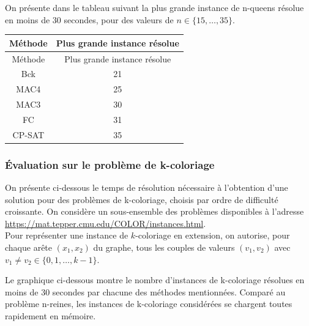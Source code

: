 \documentclass[14pt]{article}
\begin{document}
On présente dans le tableau suivant la plus grande instance de n-queens résolue en moins de 30 secondes, pour des valeurs de $n \in \{15,\dots,35\}$.

\begin{longtable}{|c|c|}
    \hline
    Méthode & Plus grande instance résolue \\
    \hline
    \endfirsthead

    Méthode & Plus grande instance résolue \\
    \hline
    \endhead

    \hline
    \endfoot

    \hline
    \endlastfoot

    Bck     & 21                           \\
    MAC4    & 25                           \\
    MAC3    & 30                           \\
    FC      & 31                           \\
    CP-SAT  & 35                           \\
\end{longtable}

\subsubsection{Évaluation sur le problème de k-coloriage}

On présente ci-dessous le temps de résolution nécessaire à l'obtention d'une solution pour des problèmes de k-coloriage, choisis par ordre de difficulté croissante. On considère un sous-ensemble des problèmes disponibles à l'adresse \href{https://mat.tepper.cmu.edu/COLOR/instances.html}{https://mat.tepper.cmu.edu/COLOR/instances.html}.\\

Pour représenter une instance de $k$-coloriage en extension, on autorise, pour chaque arête $(x_1,x_2)$ du graphe, tous les couples de valeurs $(v_1,v_2)$ avec $v_1 \neq v_2 \in \{0,1,\dots,k-1\}$.

Le graphique ci-dessous montre le nombre d'instances de k-coloriage résolues en moins de 30 secondes par chacune des méthodes mentionnées. Comparé au problème n-reines, les instances de k-coloriage considérées se chargent toutes rapidement en mémoire.
\end{document}
